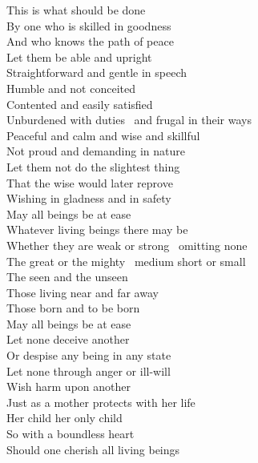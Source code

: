 \begin{english-only}
  This is what should be done\\
  By one who is skilled in goodness\\
  And who knows the path of peace\\
  Let them be able and upright\\
  Straightforward and gentle in speech\\
  Humble and not conceited\\
  Contented and easily satisfied\\
  Unburdened with duties \breathmark\ and frugal in their ways\\
  Peaceful and calm and wise and skillful\\
  Not proud and demanding in nature\\
  Let them not do the slightest thing\\
  That the wise would later reprove\\
  Wishing in gladness and in safety\\
  May all beings be at ease\\
  Whatever living beings there may be\\
  Whether they are weak or strong \breathmark\ omitting none\\
  The great or the mighty \breathmark\ medium short or small\\
  The seen and the unseen\\
  Those living near and far away\\
  Those born and to be born\\
  May all beings be at ease\\
  Let none deceive another\\
  Or despise any being in any state\\
  Let none through anger or ill-will\\
  Wish harm upon another\\
  Just\ifdigital\makeatletter\hyperlink{endnote49-appendix}\makeatother\fi
  as a mother protects with her life\\
  Her child her only child\\
  So with a boundless heart\\
  Should one cherish\makeatletter\hyperlink{endnote161-appendix} all living beings\\

\end{english-only}
